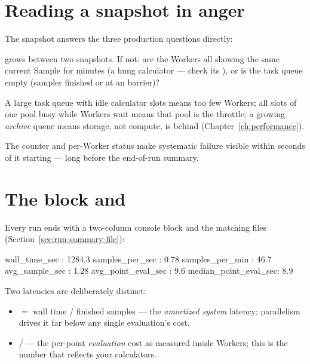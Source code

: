\section{Reading a snapshot in anger}
\label{sec:monitor-diagnosis}

The snapshot answers the three production questions directly:

\begin{description}[style=nextline, leftmargin=1.2em]
  \item[Is it moving?]  grows between two snapshots. If not: are the
        Workers all showing the same current Sample for minutes (a hung calculator ---
        check its ), or is the task queue empty (sampler finished or
        at an  barrier)?
  \item[Where is the bottleneck?] A large task queue with idle calculator slots means
        too few Workers; all slots of one pool busy while Workers wait means that pool
        is the throttle; a growing \emph{archive} queue means storage, not compute, is
        behind (Chapter~\ref{ch:performance}).
  \item[Is anything dying?] The  counter and per-Worker status make
        systematic failure visible within seconds of it starting --- long before the
        end-of-run summary.
\end{description}

\section{The  block and }
\label{sec:scan-performance}

Every run ends with a two-column console block and the matching
 files (Section~\ref{sec:run-summary-file}):

\begin{terminal}
\begin{jout}
  wall_time_sec        :  1284.3
  samples_per_sec      :  0.78
  samples_per_min      :  46.7
  avg_sample_sec       :  1.28
  avg_point_eval_sec   :  9.6
  median_point_eval_sec:  8.9
\end{jout}
\end{terminal}

Two latencies are deliberately distinct:

\begin{itemize}
  \item {} $=$ wall time $/$ finished samples --- the
        \emph{amortized system} latency; parallelism drives it far below any single
        evaluation's cost.
  \item {} /  --- the
        per-point \emph{evaluation} cost as measured inside Workers; this is the
        number that reflects your calculators.
\end{itemize}

